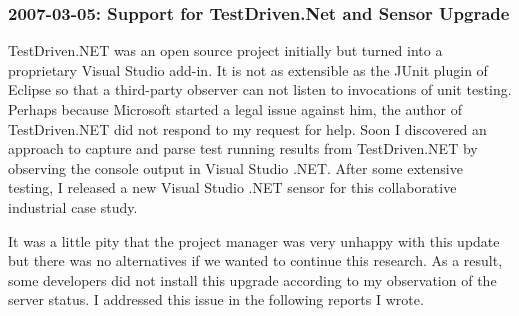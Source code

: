 \subsubsection{2007-03-05: Support for TestDriven.Net and Sensor Upgrade}
TestDriven.NET was an open source project initially but turned into a proprietary Visual Studio add-in. It is not as extensible as the JUnit plugin of Eclipse so that a third-party observer can not listen to invocations of unit testing. Perhaps because Microsoft started a legal issue against him, the author of TestDriven.NET did not respond to my request for help. Soon I discovered an approach to capture and parse test running results from TestDriven.NET by observing the console output in Visual Studio .NET. After some extensive testing, I released a new Visual Studio .NET sensor for this collaborative industrial case study. %

It was a little pity that the project manager was very unhappy with this update but there was no alternatives if we wanted to continue this research. As a result, some developers did not install this upgrade according to my observation of the server status. I addressed this issue in the following reports I wrote.


